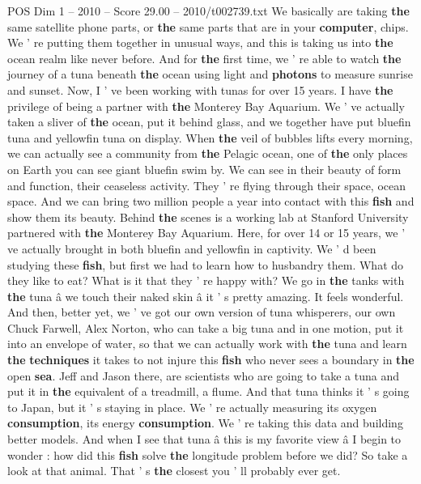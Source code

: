 \begin{textsample}{POS Dim 1 – 2010 – Score 29.00 – 2010/t002739.txt}
We basically are taking \textbf{the} same satellite phone parts, or \textbf{the} same parts that are in your \textbf{computer}, chips.
We ' re putting them together in unusual ways, and this is taking us into \textbf{the} ocean realm like never before.
And for \textbf{the} first time, we ' re able to watch \textbf{the} journey of a tuna beneath \textbf{the} ocean using light and \textbf{photons} to measure sunrise and sunset.
Now, I ' ve been working with tunas for over 15 years.
I have \textbf{the} privilege of being a partner with \textbf{the} Monterey Bay Aquarium.
We ' ve actually taken a sliver of \textbf{the} ocean, put it behind glass, and we together have put bluefin tuna and yellowfin tuna on display.
When \textbf{the} veil of bubbles lifts every morning, we can actually see a community from \textbf{the} Pelagic ocean, one of \textbf{the} only places on Earth you can see giant bluefin swim by.
We can see in their beauty of form and function, their ceaseless activity.
They ' re flying through their space, ocean space.
And we can bring two million people a year into contact with this \textbf{fish} and show them its beauty.
Behind \textbf{the} scenes is a working lab at Stanford University partnered with \textbf{the} Monterey Bay Aquarium.
Here, for over 14 or 15 years, we ' ve actually brought in both bluefin and yellowfin in captivity.
We ' d been studying these \textbf{fish}, but first we had to learn how to husbandry them.
What do they like to eat?
What is it that they ' re happy with?
We go in \textbf{the} tanks with \textbf{the} tuna â we touch their naked skin â it ' s pretty amazing.
It feels wonderful.
And then, better yet, we ' ve got our own version of tuna whisperers, our own Chuck Farwell, Alex Norton, who can take a big tuna and in one motion, put it into an envelope of water, so that we can actually work with \textbf{the} tuna and learn \textbf{the} \textbf{techniques} it takes to not injure this \textbf{fish} who never sees a boundary in \textbf{the} open \textbf{sea}.
Jeff and Jason there, are scientists who are going to take a tuna and put it in \textbf{the} equivalent of a treadmill, a flume.
And that tuna thinks it ' s going to Japan, but it ' s staying in place.
We ' re actually measuring its oxygen \textbf{consumption}, its energy \textbf{consumption}.
We ' re taking this data and building better models.
And when I see that tuna â this is my favorite view â I begin to wonder : how did this \textbf{fish} solve \textbf{the} longitude problem before we did?
So take a look at that animal.
That ' s \textbf{the} closest you ' ll probably ever get.

\end{textsample}
